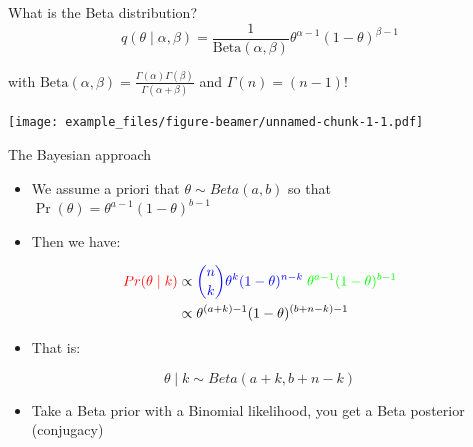 \documentclass[
  ignorenonframetext,
  aspectratio=169]{beamer}
\providecommand{\tightlist}{%
  \setlength{\itemsep}{0pt}\setlength{\parskip}{0pt}}
\begin{document}
\begin{frame}{What is the Beta distribution?}
\protect\hypertarget{what-is-the-beta-distribution}{}
\[
q(\theta \mid \alpha, \beta) = \frac{1}{\text{Beta}(\alpha, \beta)}{\theta^{\alpha - 1}} {(1-\theta)^{\beta - 1}} 
\]

with
\(\text{Beta}(\alpha, \beta) = \displaystyle{\frac{\Gamma(\alpha)\Gamma(\beta)}{\Gamma(\alpha+\beta)}}\)
and \(\Gamma(n) = (n-1)!\)
\end{frame}

\begin{frame}
\texttt{[image: example\_files/figure-beamer/unnamed-chunk-1-1.pdf]}
\end{frame}

\begin{frame}{The Bayesian approach}
\protect\hypertarget{the-bayesian-approach-1}{}
\begin{itemize}
\tightlist
\item
  We assume a priori that \(\theta \sim Beta(a,b)\) so that
  \(\Pr(\theta) = \theta^{a-1} (1 - \theta)^{b-1}\)
\end{itemize}

\pause

\begin{itemize}
\tightlist
\item
  Then we have:
\end{itemize}

\[
\begin{aligned}
{\color{red}{Pr(\theta \mid k)}} & \propto {\color{blue}{\binom{n}{k}\theta^k(1-\theta)^{n-k}}} \; {\color{green}{\theta^{a-1} (1 - \theta)^{b-1}}}\\
& \propto {\theta^{(a+k)-1}} {(1-\theta)^{(b+n-k)-1}} 
\end{aligned}
\]

\pause

\begin{itemize}
\tightlist
\item
  That is:
\end{itemize}

\[ \theta \mid k \sim Beta(a+k,b+n-k)\]

\pause

\begin{itemize}
\tightlist
\item
  Take a Beta prior with a Binomial likelihood, you get a Beta posterior
  (conjugacy)
\end{itemize}
\end{frame}
\end{document}
